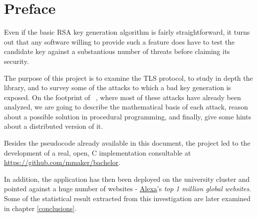 \chapter{Preface}

Even if the basic RSA key generation algorithm is fairly straightforward, it
turns out that any software willing to provide such a feature does have to test
the candidate key against a substantious number of threats before claiming its
security.

The purpose of this project is to examine the TLS protocol, to study in depth
the \openssl library, and to survey some of the attacks to which a bad key
generation is exposed. On the footprint of ~\cite{20years}, where most of these
attacks have already been analyzed, we are going to describe the mathematical
basis of each attack, reason about a possible solution in procedural
programming, and finally, give some hints about a distributed version of it.

Besides the pseudocode already available in this document, the project led to the
development of a real, open, C implementation consultable at
{\small \url{https://github.com/mmaker/bachelor}}.

In addition, the application has then been deployed on the
university cluster and pointed against a huge number of websites -
\href{http://www.alexa.com/}{Alexa}'s \emph{top 1 million global websites}.
Some of the statistical result extracted from this investigation are later
examined in chapter \ref{conclusions}.

